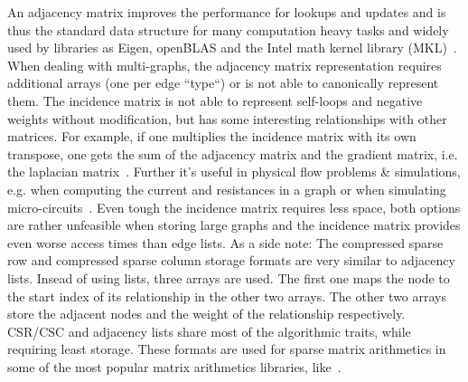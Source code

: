         An adjacency matrix improves the performance for lookups and updates and is thus the standard data structure for many computation heavy tasks and widely used by libraries as Eigen, openBLAS and the Intel math kernel library (MKL)~\autocite{MatrixStorageSchemes-2021-03-05, EigenTheMatrixclass-2020-12-05, MatrixStorageSchemes-1999-10-01}. 
        When dealing with multi-graphs, the adjacency matrix representation requires additional arrays (one per edge ``type``) or is not able to canonically represent them.       
        The incidence matrix is not able to represent self-loops and negative weights without modification, but has some interesting relationships with other matrices. 
        For example, if one multiplies the incidence matrix with its own transpose, one gets the sum of the adjacency matrix and the gradient matrix, i.e. the laplacian matrix~\autocite{brouwer2011spectra}. 
        Further it's useful in physical flow problems \& simulations, e.g. when computing the current and resistances in a graph or when simulating micro-circuits~\autocite{weinberg1958kirchhoff}.
        Even tough the incidence matrix requires less space, both options are rather unfeasible when storing large graphs and the incidence matrix provides even worse access times than edge lists.        
        As a side note: The compressed sparse row and compressed sparse column storage formats are very similar to adjacency lists. 
        Insead of using lists, three arrays are used. 
        The first one maps the node to the start index of its relationship in the other two arrays. 
        The other two arrays store the adjacent nodes and the weight of the relationship respectively. 
        CSR/CSC and adjacency lists share most of the algorithmic traits, while requiring least storage. 
        These formats are used for sparse matrix arithmetics in some of the most popular matrix arithmetics libraries, like~\autocite{MatrixStorageSchemes-2021-03-05, EigenTheMatrixclass-2020-12-05, MatrixStorageSchemes-1999-10-01}.  \\
        

